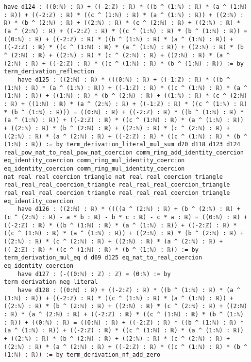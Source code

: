 \documentclass{article}
\begin{document}
\begin{tcolorbox}[colback=white!10, width=\linewidth]
\begin{lstlisting}[language=Lean4]
    have d124 : ((0:ℕ) : ℝ) + ((-2:ℤ) : ℝ) * ((b ^ (1:ℕ) : ℝ) * (a ^ (1:ℕ) : ℝ)) + ((-2:ℤ) : ℝ) * ((c ^ (1:ℕ) : ℝ) * (a ^ (1:ℕ) : ℝ)) + ((2:ℕ) : ℝ) * (b ^ (2:ℕ) : ℝ) + ((2:ℕ) : ℝ) * (c ^ (2:ℕ) : ℝ) + ((2:ℕ) : ℝ) * (a ^ (2:ℕ) : ℝ) + ((-2:ℤ) : ℝ) * ((c ^ (1:ℕ) : ℝ) * (b ^ (1:ℕ) : ℝ)) = ((0:ℕ) : ℝ) + ((-2:ℤ) : ℝ) * ((b ^ (1:ℕ) : ℝ) * (a ^ (1:ℕ) : ℝ)) + ((-2:ℤ) : ℝ) * ((c ^ (1:ℕ) : ℝ) * (a ^ (1:ℕ) : ℝ)) + ((2:ℕ) : ℝ) * (b ^ (2:ℕ) : ℝ) + ((2:ℕ) : ℝ) * (c ^ (2:ℕ) : ℝ) + ((2:ℕ) : ℝ) * (a ^ (2:ℕ) : ℝ) + ((-2:ℤ) : ℝ) * ((c ^ (1:ℕ) : ℝ) * (b ^ (1:ℕ) : ℝ)) := by term_derivation_reflection
    have d125 : ((2:ℕ) : ℝ) * (((0:ℕ) : ℝ) + ((-1:ℤ) : ℝ) * ((b ^ (1:ℕ) : ℝ) * (a ^ (1:ℕ) : ℝ)) + ((-1:ℤ) : ℝ) * ((c ^ (1:ℕ) : ℝ) * (a ^ (1:ℕ) : ℝ)) + ((1:ℕ) : ℝ) * (b ^ (2:ℕ) : ℝ) + ((1:ℕ) : ℝ) * (c ^ (2:ℕ) : ℝ) + ((1:ℕ) : ℝ) * (a ^ (2:ℕ) : ℝ) + ((-1:ℤ) : ℝ) * ((c ^ (1:ℕ) : ℝ) * (b ^ (1:ℕ) : ℝ))) = ((0:ℕ) : ℝ) + ((-2:ℤ) : ℝ) * ((b ^ (1:ℕ) : ℝ) * (a ^ (1:ℕ) : ℝ)) + ((-2:ℤ) : ℝ) * ((c ^ (1:ℕ) : ℝ) * (a ^ (1:ℕ) : ℝ)) + ((2:ℕ) : ℝ) * (b ^ (2:ℕ) : ℝ) + ((2:ℕ) : ℝ) * (c ^ (2:ℕ) : ℝ) + ((2:ℕ) : ℝ) * (a ^ (2:ℕ) : ℝ) + ((-2:ℤ) : ℝ) * ((c ^ (1:ℕ) : ℝ) * (b ^ (1:ℕ) : ℝ)) := by term_derivation_literal_mul_sum d70 d118 d123 d124 real_pow_nat_to_real_pow_nat_coercion comm_ring_add_identity_coercion eq_identity_coercion comm_ring_mul_identity_coercion eq_identity_coercion comm_ring_mul_identity_coercion nat_real_real_coercion_triangle nat_real_real_coercion_triangle real_real_real_coercion_triangle real_real_real_coercion_triangle real_real_real_coercion_triangle real_real_real_coercion_triangle eq_identity_coercion
    have d126 : ((2:ℕ) : ℝ) * ((((a ^ (2:ℕ) : ℝ) + (b ^ (2:ℕ) : ℝ) + (c ^ (2:ℕ) : ℝ) - a * b : ℝ) - b * c : ℝ) - c * a : ℝ) = ((0:ℕ) : ℝ) + ((-2:ℤ) : ℝ) * ((b ^ (1:ℕ) : ℝ) * (a ^ (1:ℕ) : ℝ)) + ((-2:ℤ) : ℝ) * ((c ^ (1:ℕ) : ℝ) * (a ^ (1:ℕ) : ℝ)) + ((2:ℕ) : ℝ) * (b ^ (2:ℕ) : ℝ) + ((2:ℕ) : ℝ) * (c ^ (2:ℕ) : ℝ) + ((2:ℕ) : ℝ) * (a ^ (2:ℕ) : ℝ) + ((-2:ℤ) : ℝ) * ((c ^ (1:ℕ) : ℝ) * (b ^ (1:ℕ) : ℝ)) := by term_derivation_mul_eq d d69 d125 eq_nat_to_real_coercion eq_identity_coercion
    have d127 : (-((0:ℕ) : ℤ) : ℤ) = (0:ℕ) := by term_derivation_neg_literal
    have d128 : ((0:ℕ) : ℝ) + ((-2:ℤ) : ℝ) * ((b ^ (1:ℕ) : ℝ) * (a ^ (1:ℕ) : ℝ)) + ((-2:ℤ) : ℝ) * ((c ^ (1:ℕ) : ℝ) * (a ^ (1:ℕ) : ℝ)) + ((2:ℕ) : ℝ) * (b ^ (2:ℕ) : ℝ) + ((2:ℕ) : ℝ) * (c ^ (2:ℕ) : ℝ) + ((2:ℕ) : ℝ) * (a ^ (2:ℕ) : ℝ) + ((-2:ℤ) : ℝ) * ((c ^ (1:ℕ) : ℝ) * (b ^ (1:ℕ) : ℝ)) + ((0:ℕ) : ℝ) = ((0:ℕ) : ℝ) + ((-2:ℤ) : ℝ) * ((b ^ (1:ℕ) : ℝ) * (a ^ (1:ℕ) : ℝ)) + ((-2:ℤ) : ℝ) * ((c ^ (1:ℕ) : ℝ) * (a ^ (1:ℕ) : ℝ)) + ((2:ℕ) : ℝ) * (b ^ (2:ℕ) : ℝ) + ((2:ℕ) : ℝ) * (c ^ (2:ℕ) : ℝ) + ((2:ℕ) : ℝ) * (a ^ (2:ℕ) : ℝ) + ((-2:ℤ) : ℝ) * ((c ^ (1:ℕ) : ℝ) * (b ^ (1:ℕ) : ℝ)) := by term_derivation_nf_add_zero

\end{lstlisting}
\end{tcolorbox}
\end{document}
